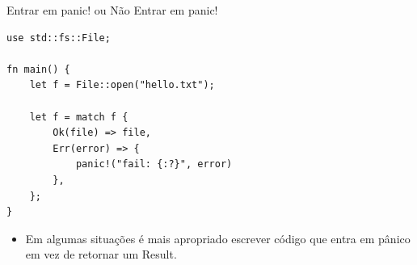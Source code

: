 \begin{frame}[fragile]{Entrar em panic! ou Não Entrar em panic!}
\lstset{language=Rust, style=boxed}
\begin{lstlisting}
use std::fs::File;

fn main() {
    let f = File::open("hello.txt");

    let f = match f {
        Ok(file) => file,
        Err(error) => {
            panic!("fail: {:?}", error)
        },
    };
}
\end{lstlisting}
\begin{itemize}
    \item Em algumas situações é mais apropriado escrever código que entra em pânico em vez de retornar um Result.
\end{itemize}

\end{frame}
